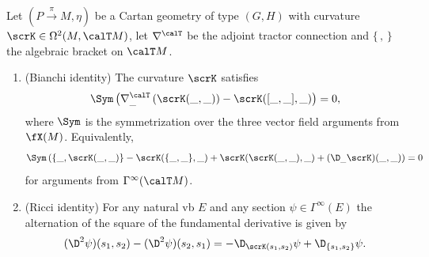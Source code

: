 \begin{prop}\label{prop 1.5.9 Cap}
    Let $(P\overset{\pi}{\to}M,\eta)$ be a Cartan geometry of type $(G,H)$ with curvature $\scrK\in\Omega^2(M,\calT M)$, let $\nabla^\calT$ be the adjoint tractor connection and $\{\,,\,\}$ the algebraic bracket on $\calT M$.
    \begin{enumerate}[label=(\arabic*)]
        \item (Bianchi identity) The curvature $\scrK$ satisfies 
        \[\Sym \left(\nabla^\calT_{\_}\left(\scrK(\_,\_)\right)-\scrK([\_,\_],\_)\right)=0,\label{eq 1.24 Cap}\]
        where $\Sym$ is the symmetrization over the three vector field arguments from $\fX(M)$. Equivalently, 
        \[\Sym\left(\{\_,\scrK(\_,\_)\}-\scrK(\{\_,\_\},\_)+\scrK(\scrK(\_,\_),\_)+(\D_{\_}\scrK)(\_,\_)\right)=0\label{eq 1.25 Cap}\]
        for arguments from $\Gamma^\infty(\calT M)$.
        \item (Ricci identity) For any natural \gls{vb} $E$ and any section $\psi\in\Gamma^\infty(E)$ the alternation of the square of the fundamental derivative is given by 
        \[(\D^2\psi)(s_1,s_2)-(\D^2\psi)(s_2,s_1)=-\D_{\scrK(s_1,s_2)}\psi+\D_{\{s_1,s_2\}}\psi.\]
    \end{enumerate}
\end{prop}
